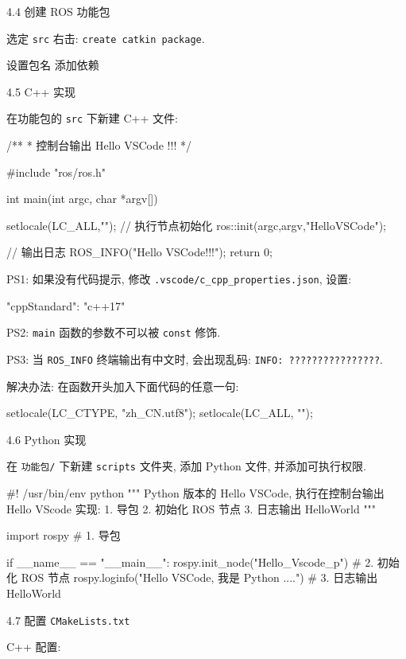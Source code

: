 \documentclass[openany, fontset=windowsold]{ctexbook}
\theoremstyle{kaiti}
\theoremstyle{normal}
\begin{document}
4.4 创建 ROS 功能包

选定 \verb|src| 右击: \verb|create catkin package|.

设置包名 添加依赖

4.5 C++ 实现

在功能包的 \verb|src| 下新建 C++ 文件:

\begin{cpp}
  /**
   *  控制台输出 Hello VSCode !!!
   */

  #include "ros/ros.h"

  int main(int argc, char *argv[])
  {
      setlocale(LC_ALL,"");
      // 执行节点初始化
      ros::init(argc,argv,"HelloVSCode");

      // 输出日志
      ROS_INFO("Hello VSCode!!!");
      return 0;
  }
\end{cpp}

PS1: 如果没有代码提示, 修改 \verb|.vscode/c_cpp_properties.json|, 设置:

\begin{xml}
  "cppStandard": "c++17"
\end{xml}

PS2: \verb|main| 函数的参数不可以被 \verb|const| 修饰.

PS3: 当 \verb|ROS_INFO| 终端输出有中文时, 会出现乱码: \verb|INFO: ????????????????|.

解决办法: 在函数开头加入下面代码的任意一句:

\begin{cpp}
  setlocale(LC_CTYPE, "zh_CN.utf8");
  setlocale(LC_ALL, "");
\end{cpp}

4.6 Python 实现

在 \verb|功能包/| 下新建 \verb|scripts| 文件夹, 添加 Python 文件, 并添加可执行权限.

\begin{python}
  #! /usr/bin/env python
  """
      Python 版本的 Hello VSCode, 执行在控制台输出 Hello VScode
      实现:
      1. 导包
      2. 初始化 ROS 节点
      3. 日志输出 HelloWorld
  """

  import rospy # 1. 导包

  if __name__ == "__main__":
      rospy.init_node("Hello_Vscode_p")  # 2. 初始化 ROS 节点
      rospy.loginfo("Hello VSCode, 我是 Python ....")  # 3. 日志输出 HelloWorld
\end{python}

4.7 配置 \verb|CMakeLists.txt|

C++ 配置:

\end{document}
